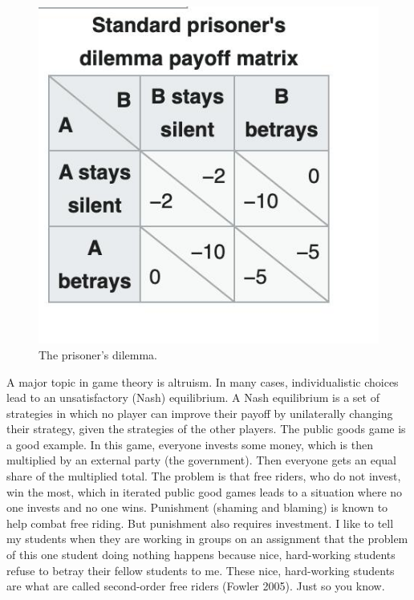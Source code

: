 \documentclass[
  a4paper,
  DIV=11,
  numbers=noendperiod,
  oneside]{scrreprt}
\begin{document}
\begin{figure}

{\centering \includegraphics{media/ch5n/image9.jpg}

}

\caption{\label{fig-ch5n-img9-old-47}The prisoner's dilemma.}

\end{figure}

A major topic in game theory is altruism. In many cases, individualistic
choices lead to an unsatisfactory (Nash) equilibrium. A Nash equilibrium
is a set of strategies in which no player can improve their payoff by
unilaterally changing their strategy, given the strategies of the other
players. The public goods game is a good example. In this game, everyone
invests some money, which is then multiplied by an external party (the
government). Then everyone gets an equal share of the multiplied total.
The problem is that free riders, who do not invest, win the most, which
in iterated public good games leads to a situation where no one invests
and no one wins. Punishment (shaming and blaming) is known to help
combat free riding. But punishment also requires investment. I like to
tell my students when they are working in groups on an assignment that
the problem of this one student doing nothing happens because nice,
hard-working students refuse to betray their fellow students to me.
These nice, hard-working students are what are called second-order free
riders (Fowler 2005). Just so you know.
\end{document}
